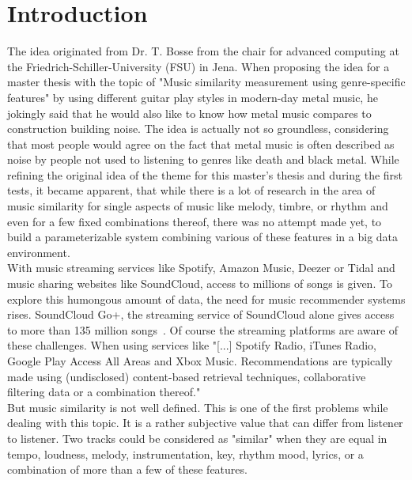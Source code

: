 \chapter{Introduction}\label{intro}

The idea originated from Dr. T. Bosse from the chair for advanced computing at the Friedrich-Schiller-University (FSU) in Jena. When proposing the idea for a master thesis with the topic of "Music similarity measurement using genre-specific features" by using different guitar play styles in modern-day metal music, he jokingly said that he would also like to know how metal music compares to construction building noise. The idea is actually not so groundless, considering that most people would agree on the fact that metal music is often described as noise by people not used to listening to genres like death and black metal.
While refining the original idea of the theme for this master's thesis and during the first tests, it became apparent, that while there is a lot of research in the area of music similarity for single aspects of music like melody, timbre, or rhythm and even for a few fixed combinations thereof, there was no attempt made yet, to build a parameterizable system combining various of these features in a big data environment.\\
With music streaming services like Spotify, Amazon Music, Deezer or Tidal and music sharing websites like SoundCloud, access to millions of songs is given. To explore this humongous amount of data, the need for music recommender systems rises. SoundCloud Go+, the streaming service of SoundCloud alone gives access to more than 135 million songs~\cite{soundcloudgo}. 
Of course the streaming platforms are aware of these challenges. When using services like "[...] Spotify Radio, iTunes Radio, Google Play Access All Areas and Xbox Music. Recommendations are typically made using (undisclosed) content-based retrieval techniques, collaborative filtering data or a combination thereof." \cite[p. 9]{knees1}\\
But music similarity is not well defined. This is one of the first problems while dealing with this topic. It is a rather subjective value that can differ from listener to listener. Two tracks could be considered as "similar" when they are equal in tempo, loudness, melody, instrumentation, key, rhythm mood, lyrics, or a combination of more than a few of these features.\\
\ \\
